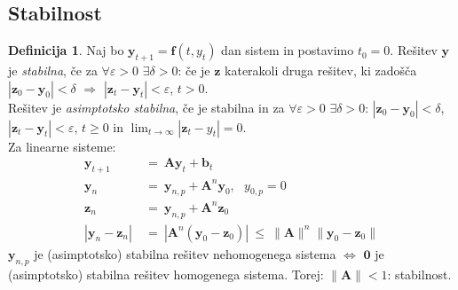 \documentclass[11pt]{article}
\renewcommand{\b}{\mathbf{b}}
\newcommand{\f}{\mathbf{f}}
\newcommand{\y}{\mathbf{y}}
\newcommand{\z}{\mathbf{z}}
\newcommand{\A}{\mathbf{A}}
\theoremstyle{definition}
\newtheorem{definicija}{Definicija}[section]
\theoremstyle{definition}
\theoremstyle{definition}
\theoremstyle{definition}
\begin{document}

\subsection{Stabilnost}
\vspace{0.5cm}

\begin{definicija}

Naj bo $\y_{t+1} = \f(t,y_t)$ dan sistem in postavimo $t_0 = 0$. Rešitev $\y$ je \textit{stabilna}, če za $\forall \varepsilon > 0$ $\exists \delta > 0$: če je $\z$ katerakoli druga rešitev, ki zadošča $|\z_0 - \y_0| < \delta$ $\Rightarrow$ $|\z_t - \y_t| < \varepsilon$, $t>0$. \\

\noindent Rešitev je \textit{asimptotsko stabilna}, če je stabilna in za $\forall \varepsilon>0$ $\exists \delta>0$: $|\z_0 - \y_0| < \delta$, $|\z_t - \y_t| < \varepsilon$, $t\geq 0$ in $\lim_{t \rightarrow \infty} |\z_t - y_t| = 0$. \\

\noindent Za linearne sisteme:
\begin{align*}
\y_{t+1} ~&=~ \A \y_t + \b_t \\
\y_n ~&=~ \y_{n,p} + \A^n \y_0, ~~~y_{0,p} = 0 \\
\z_n ~&=~ \y_{n,p} + \A^n \z_0 \\
|\y_n - \z_n| ~&=~ |\A^n(\y_0 - \z_0)| ~\leq~ \|\A\|^n \|\y_0 - \z_0\|
\end{align*}
$\y_{n,p}$ je (asimptotsko) stabilna rešitev nehomogenega sistema $\iff$ $\mathbf{0}$ je (asimptotsko) stabilna rešitev homogenega sistema. Torej: $\|\A\| <1$: stabilnost.

\end{definicija}
\vspace{0.5cm}


\pagebreak

\end{document}
